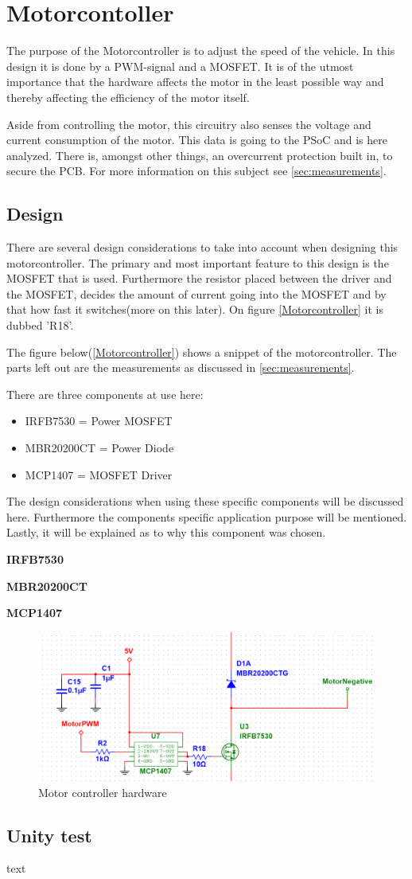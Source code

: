 \section{Motorcontoller}
The purpose of the Motorcontroller is to adjust the speed of the vehicle. In this design it is done by a PWM-signal and a MOSFET. It is of the utmost importance that the hardware affects the motor in the least possible way and thereby affecting the efficiency of the motor itself.

Aside from controlling the motor, this circuitry also senses the voltage and current consumption of the motor. This data is going to the PSoC and is here analyzed. There is, amongst other things, an overcurrent protection built in, to secure the PCB. For more information on this subject see \vref{sec:measurements}.

\subsection{Design}
There are several design considerations to take into account when designing this motorcontroller. The primary and most important feature to this design is the MOSFET that is used. Furthermore the resistor placed between the driver and the MOSFET, decides the amount of current going into the MOSFET and by that how fast it switches(more on this later). On figure \vref{Motorcontroller} it is dubbed 'R18'. 

The figure below(\vref{Motorcontroller}) shows a snippet of the motorcontroller. The parts left out are the measurements as discussed in \vref{sec:measurements}.

There are three components at use here:

\begin{itemize}
	\item{IRFB7530 = Power MOSFET}
	\item{MBR20200CT = Power Diode}
	\item{MCP1407 = MOSFET Driver}
\end{itemize}

The design considerations when using these specific components will be discussed here. Furthermore the components specific application purpose will be mentioned. Lastly, it will be explained as to why this component was chosen.  

\textbf{IRFB7530}

\textbf{MBR20200CT}

\textbf{MCP1407}

\begin{figure}[H]
	\centering
	\includegraphics[width=0.85\linewidth]{Hardware/Pictures/Motorstyring}
	\caption{Motor controller hardware}
	\label{fig:Motorcontroller}
\end{figure}


\subsection{Unity test}
text